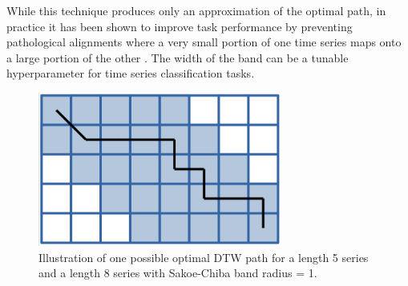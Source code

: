 \documentclass[12pt, letterpaper]{article}
\begin{document}
While this technique produces only an approximation of the optimal path, in
practice it has been shown to improve task performance by preventing
pathological alignments where a very small portion of one time series maps onto
a large portion of the other \cite{keogh_exact_2002}. The width of the band
can be a tunable hyperparameter for time series classification tasks.

\begin{figure}[htbp]
\includegraphics[height=2in]{img/sakoe_chiba.png}
\centering
\caption{Illustration of one possible optimal DTW path for a length 5 series and
a length 8 series with Sakoe-Chiba band radius = 1.}
\label{sakoe_chiba}
\end{figure}
\end{document}

